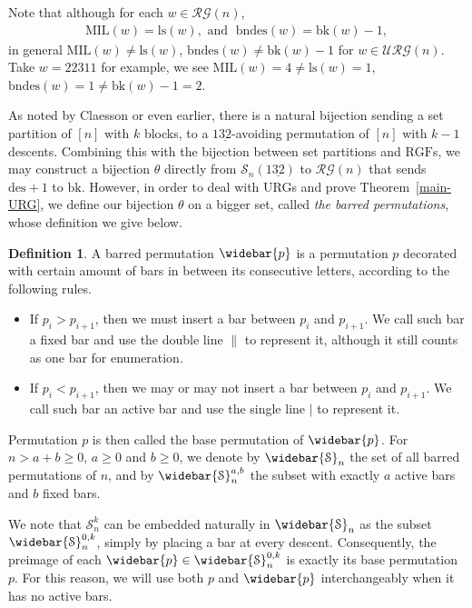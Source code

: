 \documentclass[12pt]{amsart}
\numberwithin{equation}{section}
\theoremstyle{plain}
\theoremstyle{definition}
\newtheorem{Def}[theorem]{Definition}
\def\MIL{\mathrm{MIL}}
\def\des{\mathrm{des}}
\def\bk{\mathrm{bk}}
\def\RGF{\mathrm{RGF}}
\def\bndes{\mathrm{bndes}}
\def\ls{\mathrm{ls}}
\def\SS{\mathcal{S}}
\def\RG{\mathcal{RG}}
\def\URG{\mathcal{URG}}
\begin{document}
Note that although for each $w\in\RG(n)$,
\begin{align}\label{mil=ls,bndes=k-1}
\MIL(w)=\ls(w), \text{ and }\; \bndes(w)=\bk(w)-1,
\end{align}
in general $\MIL(w)\neq \ls(w)$, $\bndes(w)\neq\bk(w)-1$ for $w\in\URG(n)$. Take $w=22311$ for example, we see $\MIL(w)=4\neq\ls(w)=1$, $\bndes(w)=1\neq\bk(w)-1=2$.

As noted by Claesson \cite[Proposition~3]{Cl} or even earlier, there is a natural bijection sending a set partition of $[n]$ with $k$ blocks, to a $1\underline{32}$-avoiding permutation of $[n]$ with $k-1$ descents. Combining this with
the bijection between set partitions and $\RGF$s, we may construct
a bijection $\theta$ directly from $\SS_n(1\underline{32})$ to $\RG(n)$ that sends $\des+1$ to $\bk$. However, in order to deal with URGs and prove Theorem~\ref{main-URG}, we define our bijection $\theta$ on a bigger set, called \emph{the barred permutations}, whose definition we give below.
\begin{Def}
A barred permutation $\widebar{p}$ is a permutation $p$ decorated with certain amount of bars in between its consecutive letters, according to the following rules.
\begin{itemize}
	\item If $p_i>p_{i+1}$, then we must insert a bar between $p_i$ and $p_{i+1}$. We call such bar a fixed bar and use the double line $\parallel$ to represent it, although it still counts as one bar for enumeration.
	\item If $p_i<p_{i+1}$, then we may or may not insert a bar between $p_i$ and $p_{i+1}$. We call such bar an active bar and use the single line $\mid$ to represent it.
\end{itemize}
Permutation $p$ is then called the base permutation of $\widebar{p}$. For $n>a+b\ge 0$, $a\ge 0$ and $b\ge 0$, we denote by $\widebar{\SS}_n$ the set of all barred permutations of $n$, and by $\widebar{\SS}_n^{a,b}$ the subset with exactly $a$ active bars and $b$ fixed bars.
\end{Def}

We note that $\SS_n^k$ can be embedded naturally in $\widebar{\SS}_n$ as the subset $\widebar{\SS}_n^{0,k}$, simply by placing a bar at every descent. Consequently, the preimage of each $\widebar{p}\in\widebar{\SS}_n^{0,k}$ is exactly its base permutation $p$. For this reason, we will use both $p$ and $\widebar{p}$ interchangeably when it has no active bars.
\end{document}
